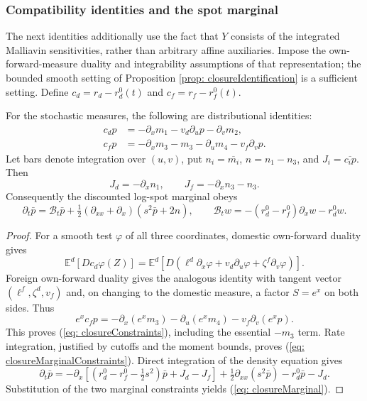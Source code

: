 \subsubsection{Compatibility identities and the spot marginal}
The next identities additionally use the fact that $Y$ consists of the
integrated Malliavin sensitivities, rather than arbitrary affine auxiliaries.
Impose the own-forward-measure duality and integrability assumptions of that
representation; the bounded smooth setting of Proposition
\ref{prop: closureIdentification} is a sufficient setting. Define
$c_d=r_d-r_d^0(t)$ and $c_f=r_f-r_f^0(t)$.

\begin{prop}\label{prop: closureCompatibility}
For the stochastic measures, the following are distributional identities:
\begin{align}
c_dp&=-\partial_xm_1-v_d\partial_up-\partial_vm_2,
\label{eq: closureConstraints}\\
c_fp&=-\partial_xm_3-m_3-\partial_um_4-v_f\partial_vp.\nonumber
\end{align}
Let bars denote integration over $(u,v)$, put $n_i=\overline{m_i}$,
$n=n_1-n_3$, and $J_i=\overline{c_i p}$. Then
\begin{equation}\label{eq: closureMarginalConstraints}
J_d=-\partial_xn_1,\qquad J_f=-\partial_xn_3-n_3.
\end{equation}
Consequently the discounted log-spot marginal obeys
\begin{equation}\label{eq: closureMarginal}
\partial_t\bar p=\mathcal B_t\bar p+
 \tfrac12(\partial_{xx}+\partial_x)(s^2\bar p+2n),
\qquad
\mathcal B_t w=-(r_d^0-r_f^0)\partial_xw-r_d^0 w.
\end{equation}
\end{prop}
\begin{proof}
For a smooth test $\varphi$ of all three coordinates, domestic own-forward
duality gives
\[
\mathbb E^d[D c_d\varphi(Z)]
=\mathbb E^d[D(\ell^d\partial_x\varphi+
                         v_d\partial_u\varphi+\zeta^f\partial_v\varphi)].
\]
Foreign own-forward duality gives the analogous identity with tangent vector
$(\ell^f,\zeta^d,v_f)$ and, on changing to the domestic measure, a factor
$S=e^x$ on both sides. Thus
\[
e^xc_fp=-\partial_x(e^xm_3)-\partial_u(e^xm_4)
                         -v_f\partial_v(e^xp).
\]
This proves (\ref{eq: closureConstraints}), including the essential $-m_3$
term. Rate integration, justified by cutoffs and the moment bounds, proves
(\ref{eq: closureMarginalConstraints}). Direct integration of the density
equation gives
\[
\partial_t\bar p=
-\partial_x\left[(r_d^0-r_f^0-\tfrac12s^2)\bar p+J_d-J_f\right]
+\tfrac12\partial_{xx}(s^2\bar p)-r_d^0\bar p-J_d.
\]
Substitution of the two marginal constraints yields
(\ref{eq: closureMarginal}).
\end{proof}

